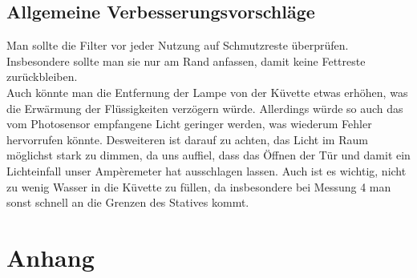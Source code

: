 \documentclass[12pt,a4paper,titlepage,headinclude,bibtotoc]{scrartcl}
\begin{document}
\subsection{Allgemeine Verbesserungsvorschläge}
Man sollte die Filter vor jeder Nutzung auf Schmutzreste überprüfen.
Insbesondere sollte man sie nur am Rand anfassen, damit keine Fettreste zurückbleiben.\\
Auch könnte man die Entfernung der Lampe von der Küvette etwas erhöhen, was die Erwärmung der Flüssigkeiten verzögern würde.
Allerdings würde so auch das vom Photosensor empfangene Licht geringer werden, was wiederum Fehler hervorrufen könnte.
Desweiteren ist darauf zu achten, das Licht im Raum möglichst stark zu dimmen, da uns auffiel, dass das Öffnen der Tür und damit ein Lichteinfall unser Ampèremeter hat ausschlagen lassen.
Auch ist es wichtig, nicht zu wenig Wasser in die Küvette zu füllen, da insbesondere bei Messung 4 man sonst schnell an die Grenzen des Statives kommt. 
\section{Anhang}


%
\end{document}
